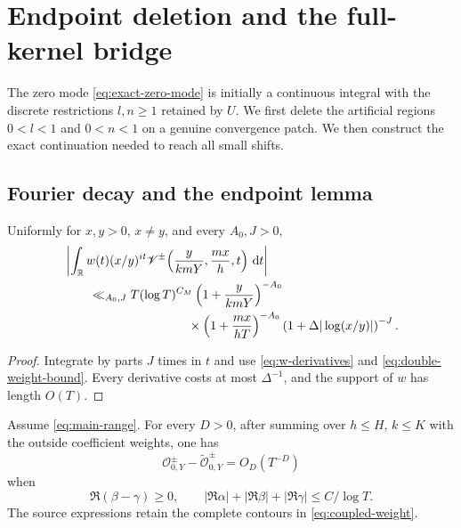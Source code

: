 \section{Endpoint deletion and the full-kernel bridge}
\label{sec:endpoint}

The zero mode \eqref{eq:exact-zero-mode} is initially a continuous integral
with the discrete restrictions $l,n\geq1$ retained by $U$.  We first delete
the artificial regions $0<l<1$ and $0<n<1$ on a genuine convergence patch.
We then construct the exact continuation needed to reach all small shifts.

\subsection{Fourier decay and the endpoint lemma}

\begin{lemma}\label{lem:fourier-conductor}
Uniformly for $x,y>0$, $x\neq y$, and every $A_0,J>0$,
\begin{align}
 &\left|\int_{\R}w(t)(x/y)^{it}
 \V^\pm\!\left(\frac{y}{kmY},\frac{mx}{h},t\right)\dd t\right|
 \notag\\
 &\qquad\ll_{A_0,J}T(\log T)^{C_M}
 \left(1+\frac{y}{kmY}\right)^{-A_0}\notag\\
 &\hspace{35mm}\times
 \left(1+\frac{mx}{hT}\right)^{-A_0}
 \left(1+\Delta|\log(x/y)|\right)^{-J}.
 \label{eq:fourier-conductor}
\end{align}
\end{lemma}

\begin{proof}
Integrate by parts $J$ times in $t$ and use
\eqref{eq:w-derivatives} and \eqref{eq:double-weight-bound}.  Every
derivative costs at most $\Delta^{-1}$, and the support of $w$ has length
$O(T)$.
\end{proof}

\begin{proposition}
\label{prop:endpoint-deletion}
Assume \eqref{eq:main-range}.  For every $D>0$, after summing over
$h\leq H$, $k\leq K$ with the outside coefficient weights, one has
\begin{equation}\label{eq:endpoint-deletion}
 \mathcal O^\pm_{0,Y}-\widetilde{\mathcal O}^\pm_{0,Y}
 =O_D(T^{-D})
\end{equation}
when
\begin{equation}\label{eq:endpoint-halfspace}
 \Re(\beta-\gamma)\geq0,\qquad
 |\Re\alpha|+|\Re\beta|+|\Re\gamma|\leq C/\log T.
\end{equation}
The source expressions retain the complete contours in
\eqref{eq:coupled-weight}.
\end{proposition}


